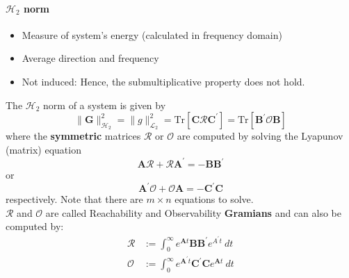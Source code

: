 \paragraph[H2-induced Norm]{$\mathcal{H}_2$ norm}
\begin{itemize}
    \item Measure of system's energy (calculated in frequency domain)
    \item Average direction and frequency
    \item Not induced: Hence, the submultiplicative property does not hold.
\end{itemize}


The $\mathcal{H}_2$ norm of a system is given by
\begin{equation*}
    \|\mathbf{G}\|_{\mathcal{H}_2}^2=\|g\|_{\mathcal{L}_2}^2=\mathrm{Tr}\left[\mathbf{C\mathcal{R}C}^{\prime}\right]=\mathrm{Tr}\left[\mathbf{B^{\prime}\mathcal{O}B}\right]
\end{equation*}
where the \textbf{symmetric} matrices $\mathbf{\mathcal{R}}$ or $\mathbf{\mathcal{O}}$ are computed by solving the Lyapunov (matrix) equation
\begin{equation*}
    \mathbf{ A\mathcal{R}}+\mathbf{\mathcal{R}A}^{\prime}=-\mathbf{BB}^{\prime}
\end{equation*}
or\begin{equation*}
    \mathbf{A^{\prime}\mathcal{O}}+\mathbf{\mathcal{O}A}=-\mathbf{C^{\prime}C}
\end{equation*}
respectively. Note that there are $m\times n$ equations to solve.\\
$\mathbf{\mathcal{R}}$ and $\mathbf{\mathcal{O}}$ are called Reachability and Observability \textbf{Gramians} and can also be computed by:
\begin{align*}
    \mathbf{\mathcal{R}} & :=\int_{0}^{\infty}e^{\mathbf{A}t}\mathbf{BB}^{\prime}e^{A^{\prime}t}\mathrm{~}dt          \\
    \mathbf{\mathcal{O}} & :=\int_{0}^{\infty}e^{\mathbf{A}^{\prime}t}\mathbf{C^{\prime}C}e^{\mathbf{A}t}\mathrm{~}dt
\end{align*}


